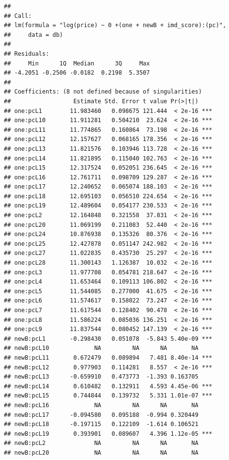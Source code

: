 \documentclass[]{book}
\begin{document}
\begin{verbatim}
## 
## Call:
## lm(formula = "log(price) ~ 0 +(one + newB + imd_score):(pc)", 
##     data = db)
## 
## Residuals:
##     Min      1Q  Median      3Q     Max 
## -4.2051 -0.2506 -0.0182  0.2198  5.3507 
## 
## Coefficients: (8 not defined because of singularities)
##                  Estimate Std. Error t value Pr(>|t|)    
## one:pcL1        11.983460   0.098675 121.444  < 2e-16 ***
## one:pcL10       11.911281   0.504210  23.624  < 2e-16 ***
## one:pcL11       11.774865   0.160864  73.198  < 2e-16 ***
## one:pcL12       12.157627   0.068165 178.356  < 2e-16 ***
## one:pcL13       11.821576   0.103946 113.728  < 2e-16 ***
## one:pcL14       11.821895   0.115040 102.763  < 2e-16 ***
## one:pcL15       12.317524   0.052051 236.645  < 2e-16 ***
## one:pcL16       12.761711   0.098709 129.287  < 2e-16 ***
## one:pcL17       12.240652   0.065074 188.103  < 2e-16 ***
## one:pcL18       12.695103   0.056510 224.654  < 2e-16 ***
## one:pcL19       12.489604   0.054177 230.533  < 2e-16 ***
## one:pcL2        12.164848   0.321558  37.831  < 2e-16 ***
## one:pcL20       11.069199   0.211083  52.440  < 2e-16 ***
## one:pcL24       10.876938   0.135326  80.376  < 2e-16 ***
## one:pcL25       12.427878   0.051147 242.982  < 2e-16 ***
## one:pcL27       11.022835   0.435730  25.297  < 2e-16 ***
## one:pcL28       11.300143   1.126387  10.032  < 2e-16 ***
## one:pcL3        11.977708   0.054781 218.647  < 2e-16 ***
## one:pcL4        11.653464   0.109113 106.802  < 2e-16 ***
## one:pcL5        11.544085   0.277000  41.675  < 2e-16 ***
## one:pcL6        11.574617   0.158022  73.247  < 2e-16 ***
## one:pcL7        11.617544   0.128402  90.478  < 2e-16 ***
## one:pcL8        11.586224   0.085036 136.251  < 2e-16 ***
## one:pcL9        11.837544   0.080452 147.139  < 2e-16 ***
## newB:pcL1       -0.298430   0.051078  -5.843 5.40e-09 ***
## newB:pcL10             NA         NA      NA       NA    
## newB:pcL11       0.672479   0.089894   7.481 8.40e-14 ***
## newB:pcL12       0.977903   0.114281   8.557  < 2e-16 ***
## newB:pcL13      -0.659910   0.473773  -1.393 0.163705    
## newB:pcL14       0.610482   0.132911   4.593 4.45e-06 ***
## newB:pcL15       0.744844   0.139732   5.331 1.01e-07 ***
## newB:pcL16             NA         NA      NA       NA    
## newB:pcL17      -0.094580   0.095188  -0.994 0.320449    
## newB:pcL18      -0.197115   0.122109  -1.614 0.106521    
## newB:pcL19       0.393901   0.089607   4.396 1.12e-05 ***
## newB:pcL2              NA         NA      NA       NA    
## newB:pcL20             NA         NA      NA       NA    

\end{verbatim}
\end{document}
